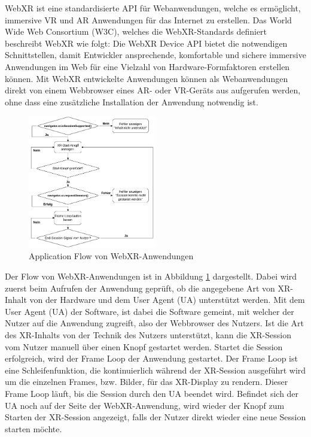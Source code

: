 WebXR ist eine standardisierte API für Webanwendungen, welche es ermöglicht, immersive VR und AR Anwendungen für das Internet zu erstellen.
Das World Wide Web Consortium (W3C), welches die WebXR-Standards definiert beschreibt WebXR wie folgt: \glqq{}Die WebXR Device API bietet die notwendigen Schnittstellen, damit Entwickler ansprechende, komfortable und sichere immersive Anwendungen im Web für eine Vielzahl von Hardware-Formfaktoren erstellen können.\grqq{} \autocite[aus dem Englischen mit DeepL ][1. Introduction]{w3c_webxr}
Mit WebXR entwickelte Anwendungen können als Webanwendungen direkt von einem Webbrowser eines AR- oder VR-Geräts aus aufgerufen werden, ohne dass eine zusätzliche Installation der Anwendung notwendig ist.

\begin{figure}[H]
    \centering
    \includegraphics[width=0.5\textwidth]{images/WebXR-App-Flow.png}
    \caption{Application Flow von WebXR-Anwendungen}
    \label{fig:webxr-app-flow}
\end{figure}

Der Flow von WebXR-Anwendungen ist in Abbildung \ref{fig:webxr-app-flow} dargestellt.
Dabei wird zuerst beim Aufrufen der Anwendung geprüft, ob die angegebene Art von XR-Inhalt von der Hardware und dem User Agent (UA) unterstützt werden.
Mit dem User Agent (UA) der Software, ist dabei die Software gemeint, mit welcher der Nutzer auf die Anwendung zugreift, also der Webbrowser des Nutzers.
Ist die Art des XR-Inhalts von der Technik des Nutzers unterstützt, kann die XR-Session vom Nutzer manuell über einen Knopf gestartet werden.
Startet die Session erfolgreich, wird der Frame Loop der Anwendung gestartet.
Der Frame Loop ist eine Schleifenfunktion, die kontinuierlich während der XR-Session ausgeführt wird um die einzelnen Frames, bzw. Bilder, für das XR-Display zu rendern.
Dieser Frame Loop läuft, bis die Session durch den UA beendet wird.
Befindet sich der UA noch auf der Seite der WebXR-Anwendung, wird wieder der Knopf zum Starten der XR-Session angezeigt, falls der Nutzer direkt wieder eine neue Session starten möchte.

